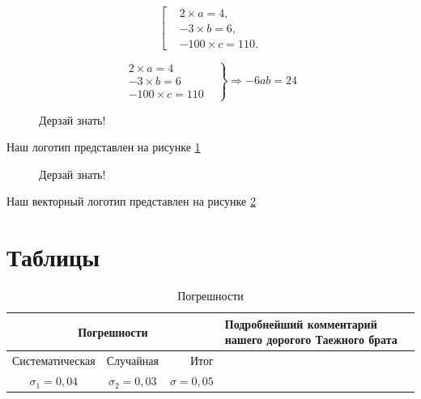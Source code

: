 \documentclass[a4paper,12pt]{article} %
\begin{document}
\[  \left[
\begin{aligned}
&2 \times a=4,\\
&-3 \times b = 6,\\
&-100 \times c = 110.
\end{aligned} \right.
\]

\[  \left.
\begin{aligned}
2 \times a=4&\\
-3 \times b = 6&\\
-100 \times c = 110&
\end{aligned} \right\} \Rightarrow -6ab=24
\]




\begin{figure}[h!]
\begin{center}
\end{center}
\caption{Дерзай знать!} \label{dz1}
\end{figure}

Наш логотип представлен на рисунке \ref{dz1}


\begin{figure}[h!]
\begin{center}

\end{center}
\caption{Дерзай знать!} \label{dz2}
\end{figure}

Наш векторный логотип представлен на рисунке \ref{dz2}


\newpage

\section{Таблицы}

\begin{table}
\caption{Погрешности}
\begin{tabular}{|c|c|rp{5cm}|}
\hline 
\multicolumn{3}{|c|}{Погрешности} &  Подробнейший комментарий нашего дорогого Таежного брата\\ 
\hline \hline 
Систематическая & Случайная & Итог & \\ 

$\sigma_1=0,04$ & $\sigma_2=0,03$ & $\sigma=0,05$ & \\ 
\hline 
\end{tabular} 
\end{table}
\end{document}
